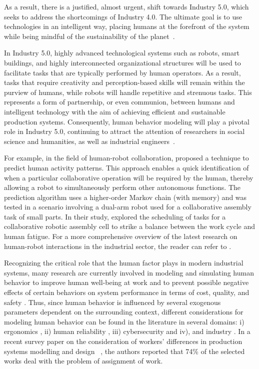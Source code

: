 \documentclass[review,12pt, 3p, times]{elsarticle}
\begin{document}
As a result, there is a justified, almost urgent, shift towards Industry 5.0, which seeks to address the shortcomings of Industry 4.0. The ultimate goal is to use technologies in an intelligent way, placing humans at the forefront of the system while being mindful of the sustainability of the planet~\citep{Destouet2023,Battini2022}. 
	
In Industry 5.0, highly advanced technological systems such as robots, smart buildings, and highly interconnected organizational structures will be used to facilitate tasks that are typically performed by human operators. As a result, tasks that require creativity and perception-based skills will remain within the purview of humans, while robots will handle repetitive and strenuous tasks. This represents a form of partnership, or even communion, between humans and intelligent technology with the aim of achieving efficient and sustainable production systems. Consequently, human behavior modeling will play a pivotal role in Industry 5.0, continuing to attract the attention of researchers in social science and humanities, as well as industrial engineers~\citep{panagou2023scoping}.

For example, in the field of human-robot collaboration, \citep{zanchettin2018} proposed a technique to predict human activity patterns. This approach enables a quick identification of when a particular collaborative operation will be required by the human, thereby allowing a robot to simultaneously perform other autonomous functions. The prediction algorithm uses a higher-order Markov chain (with memory) and was tested in a scenario involving a dual-arm robot used for a collaborative assembly task of small parts. In their study, \citep{zhang2021task} explored the scheduling of tasks for a collaborative robotic assembly cell to strike a balance between the work cycle and human fatigue. For a more comprehensive overview of the latest research on human-robot interactions in the industrial sector, the reader can refer to \citep{hjorth2022human, liu2022application, vicentini2021collaborative, hentout2019human}.
	
Recognizing the critical role that the human factor plays in modern industrial systems, many research are currently involved in modeling and simulating human behavior to improve human well-being at work and to prevent possible negative effects of certain behaviors on system performance in terms of cost, quality, and safety \citep{Jahanmahin2022}.
Thus, since human behavior is influenced by several exogenous parameters dependent on the surrounding context, different considerations for modeling human behavior can be found in the literature in several domains:  i) ergonomics \citep{ferjani2015,ferjani2017, Berlin2017, Greig2019}, ii) human reliability \citep{Azarkhil2014,DiPasquale2013,Dantan2020}, iii) cybersecurity \citep{Upadhyay2022,SanchezAguayo2021,Domarkiene2021,Moallem2021} and iv), and industry \citep{Schia2019,Kong2020,Mossa2015}. In a recent survey paper 
on the consideration of workers’ differences in production systems modelling and design ~\cite{Katiraee2021a}, the authors reported that 74\% of the selected works deal with the problem of assignment of work. 
\end{document}
